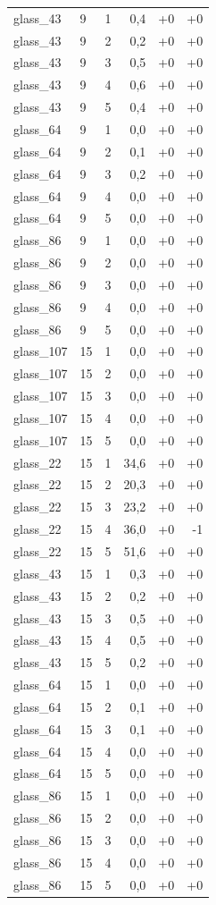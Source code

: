 \begin{longtable}{@{}llrrrr@{}}
glass\_43 & 9 & 1 & 0,4 & +0 & +0 \\
glass\_43 & 9 & 2 & 0,2 & +0 & +0 \\
glass\_43 & 9 & 3 & 0,5 & +0 & +0 \\
glass\_43 & 9 & 4 & 0,6 & +0 & +0 \\
glass\_43 & 9 & 5 & 0,4 & +0 & +0 \\
glass\_64 & 9 & 1 & 0,0 & +0 & +0 \\
glass\_64 & 9 & 2 & 0,1 & +0 & +0 \\
glass\_64 & 9 & 3 & 0,2 & +0 & +0 \\
glass\_64 & 9 & 4 & 0,0 & +0 & +0 \\
glass\_64 & 9 & 5 & 0,0 & +0 & +0 \\
glass\_86 & 9 & 1 & 0,0 & +0 & +0 \\
glass\_86 & 9 & 2 & 0,0 & +0 & +0 \\
glass\_86 & 9 & 3 & 0,0 & +0 & +0 \\
glass\_86 & 9 & 4 & 0,0 & +0 & +0 \\
glass\_86 & 9 & 5 & 0,0 & +0 & +0 \\
glass\_107 & 15 & 1 & 0,0 & +0 & +0 \\
glass\_107 & 15 & 2 & 0,0 & +0 & +0 \\
glass\_107 & 15 & 3 & 0,0 & +0 & +0 \\
glass\_107 & 15 & 4 & 0,0 & +0 & +0 \\
glass\_107 & 15 & 5 & 0,0 & +0 & +0 \\
glass\_22 & 15 & 1 & 34,6 & +0 & +0 \\
glass\_22 & 15 & 2 & 20,3 & +0 & +0 \\
glass\_22 & 15 & 3 & 23,2 & +0 & +0 \\
glass\_22 & 15 & 4 & 36,0 & +0 & -1 \\
glass\_22 & 15 & 5 & 51,6 & +0 & +0 \\
glass\_43 & 15 & 1 & 0,3 & +0 & +0 \\
glass\_43 & 15 & 2 & 0,2 & +0 & +0 \\
glass\_43 & 15 & 3 & 0,5 & +0 & +0 \\
glass\_43 & 15 & 4 & 0,5 & +0 & +0 \\
glass\_43 & 15 & 5 & 0,2 & +0 & +0 \\
glass\_64 & 15 & 1 & 0,0 & +0 & +0 \\
glass\_64 & 15 & 2 & 0,1 & +0 & +0 \\
glass\_64 & 15 & 3 & 0,1 & +0 & +0 \\
glass\_64 & 15 & 4 & 0,0 & +0 & +0 \\
glass\_64 & 15 & 5 & 0,0 & +0 & +0 \\
glass\_86 & 15 & 1 & 0,0 & +0 & +0 \\
glass\_86 & 15 & 2 & 0,0 & +0 & +0 \\
glass\_86 & 15 & 3 & 0,0 & +0 & +0 \\
glass\_86 & 15 & 4 & 0,0 & +0 & +0 \\
glass\_86 & 15 & 5 & 0,0 & +0 & +0 \\
\end{longtable}
